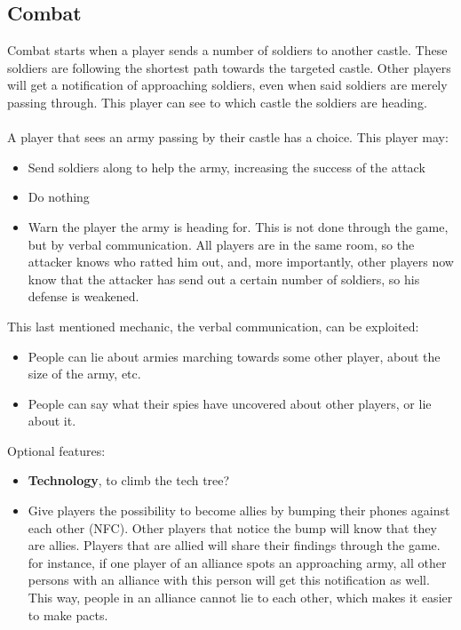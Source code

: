 \documentclass{article}
\begin{document}
\subsection*{Combat}
Combat starts when a player sends a number of soldiers to another castle. These soldiers are following the shortest path towards the targeted castle. Other players will get a notification of approaching soldiers, even when said soldiers are merely passing through. This player can see to which castle the soldiers are heading. \\\\
A player that sees an army passing by their castle has a choice. This player may: 
\begin{itemize}
	\item Send soldiers along to help the army, increasing the success of the attack
	\item Do nothing
	\item Warn the player the army is heading for. This is not done through the game, but by verbal communication. All players are in the same room, so the attacker knows who ratted him out, and, more importantly, other players now know that the attacker has send out a certain number of soldiers, so his defense is weakened.
\end{itemize}
\vspace{0.2 cm}
This last mentioned mechanic, the verbal communication, can be exploited:
\begin{itemize}
	\item 	People can lie about armies marching towards some other player, about the size of the army, etc.
	\item People can say what their spies have uncovered about other players, or lie about it.
\end{itemize}
\vspace{0.2 cm}
Optional features:
\begin{itemize}
	\item \textbf{Technology}, to climb the tech tree?
    \item Give players the possibility to become allies by bumping their phones against each other (NFC). Other players that notice the bump will know that they are allies. Players that are allied will share their findings through the game. for instance, if one player of an alliance spots an approaching army, all other persons with an alliance with this person will get this notification as well. This way, people in an alliance cannot lie to each other, which makes it easier to make pacts.

\end{itemize}
\end{document}

